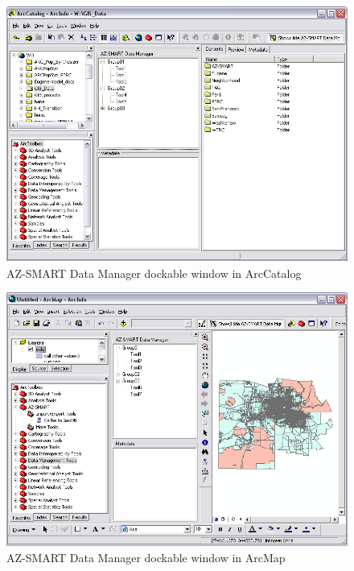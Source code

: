 \begin{figure}[h]
\begin{center}
\includegraphics[scale=0.4]{figures/AZ-SMART_DataManager_in_ArcCatalog.png}
\caption{AZ-SMART Data Manager dockable window in ArcCatalog}
\label{figCatalog}
\end{center}
\end{figure}

\begin{figure}[h]
\begin{center}
\includegraphics[scale=0.4]{figures/AZ-SMART_DataManager_in_ArcMap.png}
\caption{AZ-SMART Data Manager dockable window in ArcMap}
\label{figMap}
\end{center}
\end{figure}

